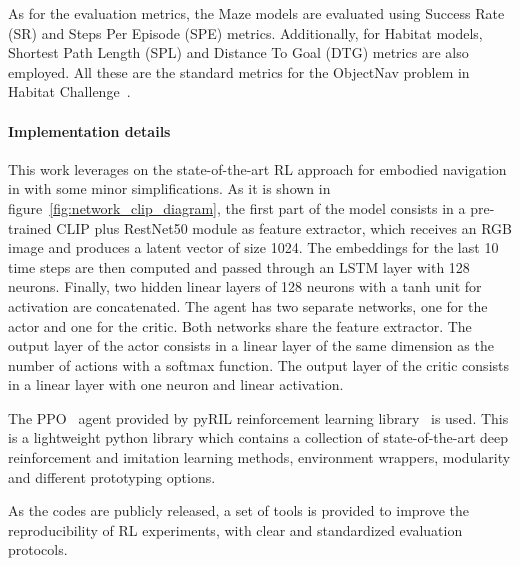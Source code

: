 As for the evaluation metrics, the Maze models are evaluated using Success Rate (SR) and Steps Per Episode (SPE) metrics.
Additionally, for Habitat models, Shortest Path Length (SPL) and Distance To Goal (DTG) metrics are also employed.
All these are the standard metrics for the ObjectNav problem in Habitat Challenge~\cite{batra2020}.

\paragraph*{Implementation details}
This work leverages on the state-of-the-art RL approach for embodied navigation in \cite{khandelwal2022} with some minor simplifications.
As it is shown in figure~\ref{fig:network_clip_diagram}, the first part of the model consists in a pre-trained CLIP plus RestNet50 module as feature extractor, which receives an RGB image and produces a latent vector of size 1024.
The embeddings for the last 10 time steps are then computed and passed through an LSTM layer with 128 neurons.
Finally, two hidden linear layers of 128 neurons with a tanh unit for activation are concatenated.
The agent has two separate networks, one for the actor and one for the critic.
Both networks share the feature extractor.
The output layer of the actor consists in a linear layer of the same dimension as the number of actions with a softmax function.
The output layer of the critic consists in a linear layer with one neuron and linear activation.

The PPO~\cite{schulman2017} agent provided by pyRIL reinforcement learning library~\cite{pyRIL} is used.
This is a lightweight python library which contains a collection of state-of-the-art deep reinforcement and imitation learning methods, environment wrappers, modularity and different prototyping options.

As the codes are publicly released, a set of tools is provided to improve the reproducibility of RL experiments, with clear and standardized evaluation protocols.

